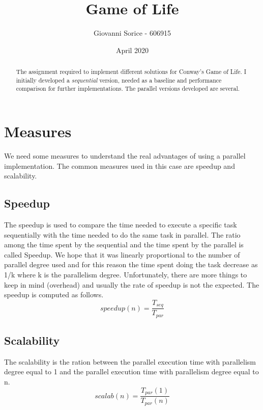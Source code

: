 \documentclass[a4paper,10pt]{article}
\title{Game of Life}
\author{Giovanni Sorice - 606915}
\date{April 2020}
\begin{document}
	

		\maketitle
		\begin{abstract}
			The assignment required to implement different solutions for Conway's Game of Life. I initially developed a \textit{sequential} version, needed as a baseline and performance comparison for further implementations. The parallel versions developed are several.
		\end{abstract}

	
	
	\section{Measures}
	We need some measures to understand the real advantages of using a parallel implementation. The common measures used in this case are speedup and scalability.
	\subsection{Speedup}
	The speedup is used to compare the time needed to execute a specific task sequentially with the time needed to do the same task in parallel. The ratio among the time spent by the sequential and the time spent by the parallel is called Speedup. We hope that it was linearly proportional to the number of parallel degree used and for this reason the time spent doing the task decrease as 1/k where k is the parallelism degree. Unfortunately, there are more things to keep in mind (overhead) and usually the rate of speedup is not the expected.
	The speedup is computed as follows.
	\begin{equation}
	speedup(n)=\frac{T_{seq}}{T_{par}}
	\end{equation}
	
	\subsection{Scalability}
	The scalability is the ration between the parallel execution time with parallelism degree equal to 1 and the parallel execution time with parallelism degree equal to n.
		\begin{equation}
	scalab(n)=\frac{T_{par}(1)}{T_{par}(n)}
	\end{equation}
\end{document}
